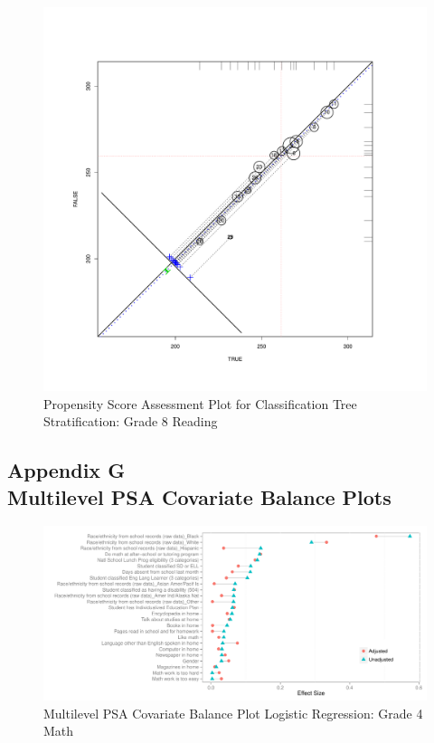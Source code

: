\clearpage
\begin{figure}
\begin{center}
\includegraphics[height=.4\textheight,width=.4\textheight]{../Figures2009/g8read-circpsa-tree.pdf}
\caption{Propensity Score Assessment Plot for Classification Tree Stratification: Grade 8 Reading}
\end{center}
\end{figure}





\clearpage
{}
\subsection*{Appendix G\\Multilevel PSA Covariate Balance Plots}

\begin{figure}[h!]
\begin{center}
\includegraphics[width=\textwidth]{../Figures2009/g4math-mlpsa-lr-balance.pdf}
\caption{Multilevel PSA Covariate Balance Plot Logistic Regression: Grade 4 Math}
\end{center}
\end{figure}

